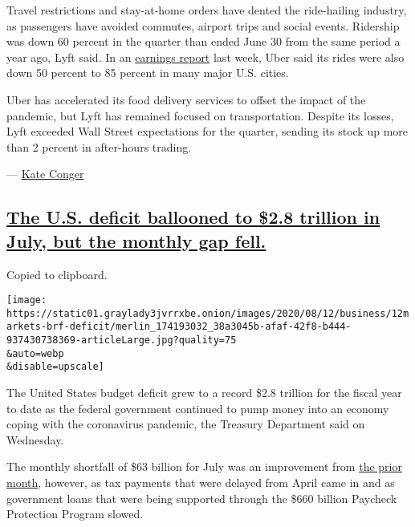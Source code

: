 Travel restrictions and stay-at-home orders have dented the ride-hailing
industry, as passengers have avoided commutes, airport trips and social
events. Ridership was down 60 percent in the quarter than ended June 30
from the same period a year ago, Lyft said. In an
\href{https://www.nytimes3xbfgragh.onion/2020/08/06/technology/uber-ride-hailing-delivery-coronavirus.html}{earnings
report} last week, Uber said its rides were also down 50 percent to 85
percent in many major U.S. cities.

Uber has accelerated its food delivery services to offset the impact of
the pandemic, but Lyft has remained focused on transportation. Despite
its losses, Lyft exceeded Wall Street expectations for the quarter,
sending its stock up more than 2 percent in after-hours trading.

--- \href{https://www.nytimes3xbfgragh.onion/by/kate-conger}{Kate
Conger}

\hypertarget{the-us-deficit-ballooned-to-28-trillion-in-july-but-the-monthly-gap-fell}{%
\subsection{\texorpdfstring{\protect\hyperlink{the-us-deficit-ballooned-to-2-8-trillion-in-july-but-the-monthly-gap-fell}{The
U.S. deficit ballooned to \$2.8 trillion in July, but the monthly gap
fell.}}{The U.S. deficit ballooned to \$2.8 trillion in July, but the monthly gap fell.}}\label{the-us-deficit-ballooned-to-28-trillion-in-july-but-the-monthly-gap-fell}}

Copied to clipboard.

\texttt{[image: https://static01.graylady3jvrrxbe.onion/images/2020/08/12/business/12markets-brf-deficit/merlin\_174193032\_38a3045b-afaf-42f8-b444-937430738369-articleLarge.jpg?quality=75\\\&auto=webp\\\&disable=upscale]}

The United States budget deficit grew to a record \$2.8 trillion for the
fiscal year to date as the federal government continued to pump money
into an economy coping with the coronavirus pandemic, the Treasury
Department said on Wednesday.

The monthly shortfall of \$63 billion for July was an improvement from
\href{https://www.nytimes3xbfgragh.onion/2020/07/13/us/politics/budget-deficit-coronavirus.html}{the
prior month}, however, as tax payments that were delayed from April came
in and as government loans that were being supported through the \$660
billion Paycheck Protection Program slowed.

